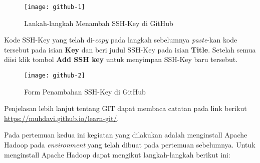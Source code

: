 \documentclass[a4paper]{tufte-handout}
\begin{document}
\begin{enumerate}
\begin{figure}[!ht]
\centering
\texttt{[image: github-1]}
\caption{Lankah-langkah Menambah SSH-Key di GitHub}
\label{gam:langkah-ssh}
\end{figure}

Kode SSH-Key yang telah di-\textit{copy} pada langkah sebelumnya \textit{paste}-kan kode tersebut pada isian \textbf{Key} dan beri judul SSH-Key pada isian \textbf{Title}. Setelah semua diisi klik tombol \textbf{Add SSH key} untuk menyimpan SSH-Key baru tersebut.

\begin{figure}[!ht]
\centering
\texttt{[image: github-2]}
\caption{Form Penambahan SSH-Key di GitHub}
\label{gam:tambah-ssh}
\end{figure}

Penjelasan lebih lanjut tentang GIT dapat membaca catatan pada link berikut \url{https://muhdavi.github.io/learn-git/}.
\end{enumerate}

\vspace*{-.5cm}
\hrulefill

\clearpage
{}

Pada pertemuan kedua ini kegiatan yang dilakukan adalah menginstall Apache Hadoop pada \textit{environment} yang telah dibuat pada pertemuan sebelumnya. Untuk menginstall Apache Hadoop dapat mengikut langkah-langkah berikut ini:
\end{document}
